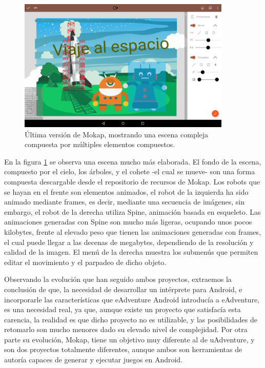 \begin{figure}[htb]
	\centerline{\includegraphics[height=2.5in]{figures/mokap2.png}}
	\caption[Mokap - Última Versión]{Última versión de Mokap, mostrando una escena compleja compuesta por múltiples elementos compuestos.}
	\label{mokap2}
\end{figure}

En la figura \ref{mokap2} se observa una escena mucho más elaborada. El fondo de la escena, compuesto por el cielo, los árboles, y el cohete -el cual se mueve- son una forma compuesta descargable desde el repositorio de recursos de Mokap. Los robots que se hayan en el frente son elementos animados, el robot de la izquierda ha sido animado mediante frames, es decir, mediante una secuencia de imágenes, sin embargo, el robot de la derecha utiliza Spine, animación basada en esqueleto. Las animaciones generadas con Spine son mucho más ligeras, ocupando unos pocos kilobytes, frente al elevado peso que tienen las animaciones generadas con frames, el cual puede llegar a las decenas de megabytes, dependiendo de la resolución y calidad de la imagen. El menú de la derecha muestra los submenús que permiten editar el movimiento y el parpadeo de dicho objeto.

Observando la evolución que han seguido ambos proyectos, extraemos la conclusión de que, la necesidad de desarrollar un intérprete para Android, e incorporarle las características que eAdventure Android introducía a eAdventure, es una necesidad real, ya que, aunque existe un proyecto que satisfacía esta carencia, la realidad es que dicho proyecto no es utilizable, y las posibilidades de retomarlo son mucho menores dado su elevado nivel de complejidad. Por otra parte su evolución, Mokap, tiene un objetivo muy diferente al de uAdventure, y son dos proyectos totalmente diferentes, aunque ambos son herramientas de autoría capaces de generar y ejecutar juegos en Android.

